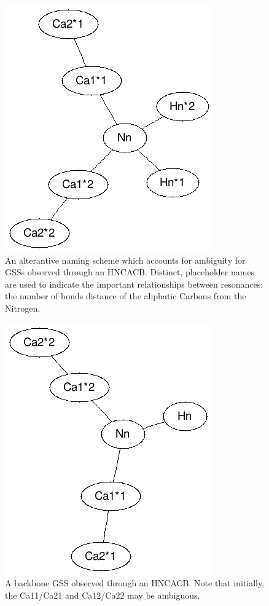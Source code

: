 \begin{figure}
  \includegraphics[scale=0.75]{figures/generic_hncacb_ambiguous}
  \caption[An alternative naming scheme which accounts for ambiguity.]
          {An alterantive naming scheme which accounts for ambiguity for
           GSSs observed through an HNCACB.  Distinct, placeholder names are
           used to indicate the important relationships between resonances:
           the number of bonds distance of the aliphatic Carbons from the
           Nitrogen.}
  \label{generic_hncacb_ambiguous}
\end{figure}

\begin{figure}
  \includegraphics[scale=0.75]{figures/backbone_hncacb_ambiguous}
  \caption[A backbone GSS observed through an HNCACB.]
          {A backbone GSS observed through an HNCACB.  Note that initially, 
           the Ca11/Ca21 and Ca12/Ca22 may be ambiguous.}
  \label{backbone_hncacb_ambiguous}
\end{figure}

